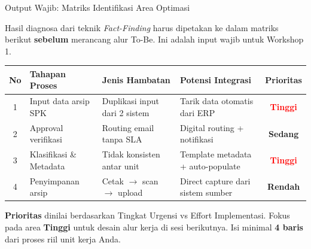 \documentclass[aspectratio=169,11pt]{beamer}
\begin{document}

\begin{frame}{Output Wajib: Matriks Identifikasi Area Optimasi}
    \vspace{0.1cm}
    \begin{premiumbox}
        \scriptsize Hasil diagnosa dari teknik \textit{Fact-Finding} harus dipetakan ke dalam matriks berikut \textbf{sebelum} merancang alur To-Be. Ini adalah input wajib untuk Workshop 1.
    \end{premiumbox}
    \vspace{0.1cm}
    \begin{table}
        \centering
        \tiny
        \begin{tabularx}{\textwidth}{@{} c X X X c @{}}
            \toprule
            \textbf{No} & \textbf{Tahapan Proses} & \textbf{Jenis Hambatan} & \textbf{Potensi Integrasi} & \textbf{Prioritas} \\
            \midrule
            1 & Input data arsip SPK & Duplikasi input dari 2 sistem & Tarik data otomatis dari ERP & \textcolor{red}{\textbf{Tinggi}} \\
            2 & Approval verifikasi & Routing email tanpa SLA & Digital routing + notifikasi & \textcolor{plnorange}{\textbf{Sedang}} \\
            3 & Klasifikasi \& Metadata & Tidak konsisten antar unit & Template metadata + auto-populate & \textcolor{red}{\textbf{Tinggi}} \\
            4 & Penyimpanan arsip & Cetak $\rightarrow$ scan $\rightarrow$ upload & Direct capture dari sistem sumber & \textcolor{plngreen}{\textbf{Rendah}} \\
            \bottomrule
        \end{tabularx}
    \end{table}
    \vspace{0.1cm}
    \begin{orangebox}
        \scriptsize \textbf{Prioritas} dinilai berdasarkan Tingkat Urgensi vs Effort Implementasi. Fokus pada area \textbf{Tinggi} untuk desain alur kerja di sesi berikutnya. Isi minimal \textbf{4 baris} dari proses riil unit kerja Anda.
    \end{orangebox}
\end{frame}
\end{document}
